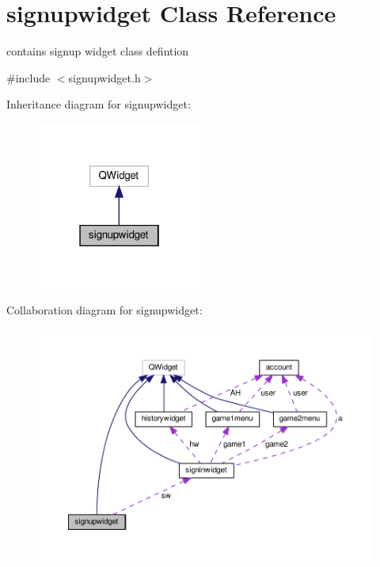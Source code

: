 \hypertarget{classsignupwidget}{}\section{signupwidget Class Reference}
\label{classsignupwidget}


contains signup widget class defintion  




{\ttfamily \#include $<$signupwidget.\+h$>$}



Inheritance diagram for signupwidget\+:\nopagebreak
\begin{figure}[H]
\begin{center}
\leavevmode
\includegraphics[width=154pt]{classsignupwidget__inherit__graph}
\end{center}
\end{figure}


Collaboration diagram for signupwidget\+:
\nopagebreak
\begin{figure}[H]
\begin{center}
\leavevmode
\includegraphics[width=350pt]{classsignupwidget__coll__graph}
\end{center}
\end{figure}
